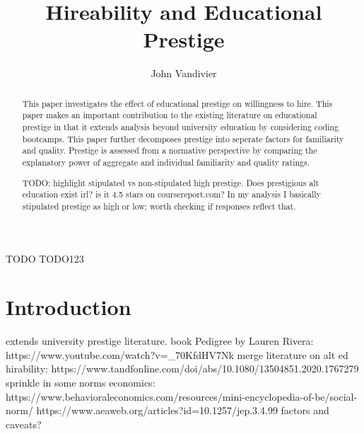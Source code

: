 \documentclass[review]{elsarticle}
\begin{document}
\begin{frontmatter}

    \title{
        Hireability and Educational Prestige
    }

    \author[mymainaddress]{John Vandivier}
    \address[mymainaddress]{4400 University Dr, Fairfax, VA 22030}

    \begin{abstract}
        This paper investigates the effect of educational prestige on willingness to hire.
        This paper makes an important contribution to the existing literature on educational prestige
        in that it extends analysis beyond university education by considering coding bootcamps.
        This paper further decomposes prestige into seperate factors for familiarity and quality.
        Prestige is assessed from a normative perspective by comparing the explanatory power of aggregate and individual familiarity and quality ratings.

        TODO: highlight stipulated vs non-stipulated high prestige. Does prestigious alt education exist irl? is it 4.5 stars on coursereport.com?
        In my analysis I basically stipulated prestige as high or low; worth checking if responses reflect that.

    \end{abstract}

    \begin{keyword}
        TODO
        \MSC[2010] TODO123 %
    \end{keyword}

\end{frontmatter}

\pagebreak
\linenumbers

\section{Introduction}

extends university prestige literature. book Pedigree by Lauren Rivera: https://www.youtube.com/watch?v=_70KfdHV7Nk
merge literature on alt ed hirability: https://www.tandfonline.com/doi/abs/10.1080/13504851.2020.1767279
sprinkle in some norms economics:
https://www.behavioraleconomics.com/resources/mini-encyclopedia-of-be/social-norm/
https://www.aeaweb.org/articles?id=10.1257/jep.3.4.99
factors and caveats?
\end{document}

